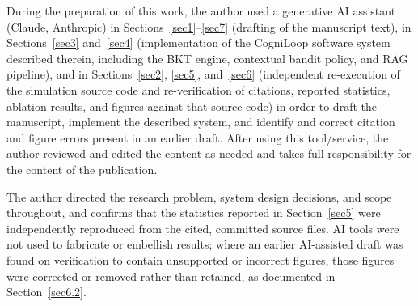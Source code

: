 \documentclass[pdflatex,sn-apa]{sn-jnl}
\begin{document}
During the preparation of this work, the author used a generative AI assistant (Claude, Anthropic) in Sections~\ref{sec1}--\ref{sec7} (drafting of the manuscript text), in Sections~\ref{sec3} and~\ref{sec4} (implementation of the CogniLoop software system described therein, including the BKT engine, contextual bandit policy, and RAG pipeline), and in Sections~\ref{sec2}, \ref{sec5}, and~\ref{sec6} (independent re-execution of the simulation source code and re-verification of citations, reported statistics, ablation results, and figures against that source code) in order to draft the manuscript, implement the described system, and identify and correct citation and figure errors present in an earlier draft. After using this tool/service, the author reviewed and edited the content as needed and takes full responsibility for the content of the publication.

The author directed the research problem, system design decisions, and scope throughout, and confirms that the statistics reported in Section~\ref{sec5} were independently reproduced from the cited, committed source files. AI tools were not used to fabricate or embellish results; where an earlier AI-assisted draft was found on verification to contain unsupported or incorrect figures, those figures were corrected or removed rather than retained, as documented in Section~\ref{sec6.2}.


\end{document}
